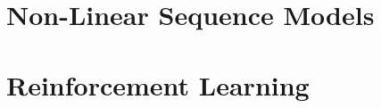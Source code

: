 \documentclass{report}
\begin{document}
\chapter{Non-Linear Sequence Models}


\chapter{Reinforcement Learning}



% 
% 


%


\end{document}

